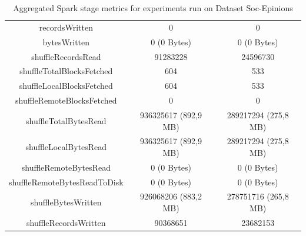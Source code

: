 \documentclass[a4paper,11pt, twoside]{article}
\begin{document}
\begin{table}[h!]
\begin{tabular}{ccc}
                        recordsWritten & 0 & 0 \\
                        bytesWritten & 0 (0 Bytes) & 0 (0 Bytes) \\
                        shuffleRecordsRead & 91283228 & 24596730 \\
                        shuffleTotalBlocksFetched & 604 & 533 \\
                        shuffleLocalBlocksFetched & 604 & 533 \\
                        shuffleRemoteBlocksFetched & 0 & 0 \\
                        shuffleTotalBytesRead & 936325617 (892,9 MB) & 289217294 (275,8 MB) \\
                        shuffleLocalBytesRead & 936325617 (892,9 MB) & 289217294 (275,8 MB) \\
                        shuffleRemoteBytesRead & 0 (0 Bytes) & 0 (0 Bytes) \\
                        shuffleRemoteBytesReadToDisk & 0 (0 Bytes) & 0 (0 Bytes) \\
                        shuffleBytesWritten & 926068206 (883,2 MB) & 278751716 (265,8 MB) \\
                        shuffleRecordsWritten & 90368651 & 23682153 \\
                    \bottomrule
                \end{tabular}
                    \caption{Aggregated Spark stage metrics for experiments run on Dataset Soc-Epinions}
                    \label{tab:stagemetrics3}
            \end{table} 
\end{document}
